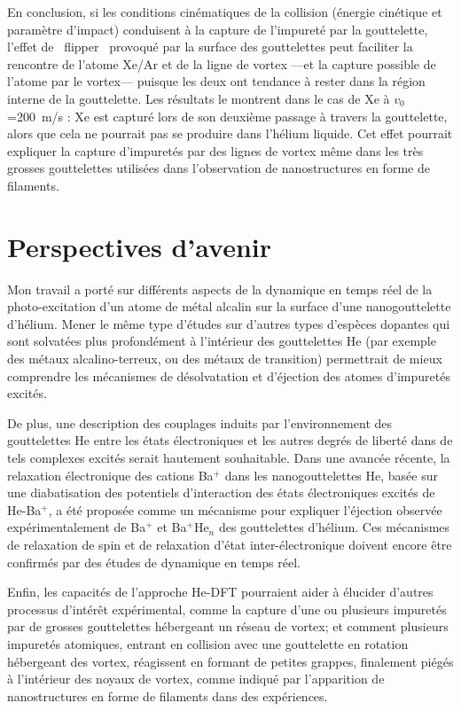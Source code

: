    En conclusion, si les conditions cinématiques de la collision (énergie cinétique et paramètre d'impact) conduisent à la capture de l'impureté par la gouttelette, l'effet de \guillemotleft~flipper~\guillemotright{} provoqué par la surface des gouttelettes peut faciliter la rencontre de l'atome Xe/Ar et de la ligne de vortex  ---et la capture possible de l'atome par le vortex--- puisque les deux ont tendance à rester dans la région interne de la gouttelette. 
   Les résultats le montrent dans le cas de Xe à $v_0$=200~m/s : Xe est capturé lors de son deuxième passage à travers la gouttelette, alors que cela ne pourrait pas se produire dans l'hélium liquide\citep{Psh16}. 
   Cet effet pourrait expliquer la capture d'impuretés par des lignes de vortex même dans les très grosses gouttelettes utilisées dans l'observation de nanostructures en forme de filaments.

	\section*{Perspectives d'avenir}
		Mon travail a porté sur différents aspects de la dynamique en temps réel de la photo-excitation d'un atome de métal alcalin sur la surface d'une nanogouttelette d'hélium. 
		Mener le même type d'études sur d'autres types d'espèces dopantes qui sont solvatées plus profondément à l'intérieur des gouttelettes He (par exemple des métaux alcalino-terreux, ou des métaux de transition) permettrait de mieux comprendre les mécanismes de désolvatation et d'éjection des atomes d'impuretés excités\citep{Loginov:2007,Loginov:2012,Kautsch:2013,Lindebner:2014}.
		
		De plus, une description des couplages induits par l'environnement des gouttelettes He entre les états électroniques et les autres degrés de liberté dans de tels complexes excités serait hautement souhaitable\citep{Closser:2014,Masson:2014}. 
		Dans une avancée récente, la relaxation électronique des cations Ba$^+$ dans les nanogouttelettes He, basée sur une diabatisation des potentiels d'interaction des états électroniques excités de He-Ba$^+$\citep{Vindel:2018}, a été proposée comme un mécanisme pour expliquer l'éjection observée expérimentalement de  Ba$^+$ et {Ba$^+$He$_n$} des gouttelettes d'hélium. 
		Ces mécanismes de relaxation de spin et de relaxation d'état inter-électronique doivent encore être confirmés par des études de dynamique en temps réel.
		
		Enfin, les capacités de l'approche He-DFT pourraient aider à élucider d'autres processus d'intérêt expérimental, comme la capture d'une ou plusieurs impuretés par de grosses gouttelettes hébergeant un réseau de vortex; et comment plusieurs impuretés atomiques, entrant en collision avec une gouttelette en rotation hébergeant des vortex, réagissent en formant de petites grappes, finalement piégés à l'intérieur des noyaux de vortex, comme indiqué par l'apparition de nanostructures en forme de filaments dans des expériences.

